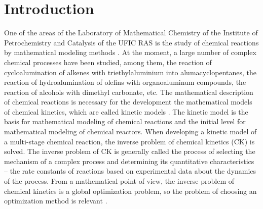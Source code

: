 \documentclass{svproc}
\begin{document}
\section{Introduction}


One of the areas of the Laboratory of Mathematical Chemistry of the Institute of Petrochemistry and Catalysis of the UFIC RAS is the study of chemical reactions by mathematical modeling methods \cite{Zaynullin2020, Zainullin2019, Gubaidullin2014}. At the moment, a large number of complex chemical processes have been studied, among  them, the reaction of cycloalumination of alkenes with triethylaluminium into alumacyclopentanes, the reaction of hydroalumination of olefins with organoaluminum compounds, the reaction of alcohols with dimethyl carbonate, etc. The mathematical description of chemical reactions is necessary for the development the mathematical models of chemical kinetics, which are called kinetic models \cite{Koledina2019}. The kinetic model is the basis for mathematical modeling of chemical reactions and the initial level for mathematical modeling of chemical reactors. When developing a kinetic model of a multi-stage chemical reaction, the inverse problem of chemical kinetics (CK) is solved. The inverse problem of CK is generally called the process of selecting the mechanism of a complex process and determining its quantitative characteristics -- the rate constants of reactions based on experimental data about the dynamics of the process. From a mathematical point of view, the inverse problem of chemical kinetics is a global optimization problem, so the problem of choosing an optimization method is relevant \cite{Enikeeva2021, Enikeeva2020}.
\end{document}
